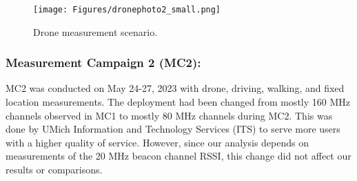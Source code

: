 \documentclass[sigconf,10pt]{acmart}
\begin{document}
\begin{figure}
     \centering
    { \texttt{[image: Figures/dronephoto2\_small.png]}} 
    \vspace{-1em}
    \caption{Drone measurement scenario.}
    \label{Fig:meas_locs_drone}
    \vspace{-1em}
\end{figure}

\subsubsection{Measurement Campaign 2 (MC2):} MC2 was conducted on May 24-27, 2023 with drone, driving, walking, and fixed location measurements. The deployment had been changed from mostly 160 MHz channels observed in MC1 to mostly 80 MHz channels during MC2. This was done by UMich Information and Technology Services (ITS) to serve more users with a higher quality of service. However, since our analysis depends on measurements of the 20 MHz beacon channel RSSI, this change did not affect our results or comparisons.
\end{document}
